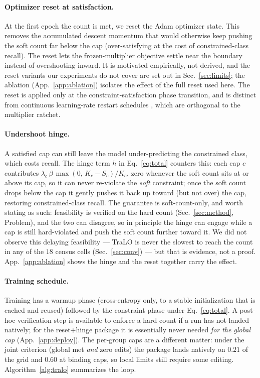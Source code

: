 \documentclass[10pt]{article}
\begin{document}
\paragraph{Optimizer reset at satisfaction.}
At the first epoch the count is met, we reset the Adam optimizer state. This
removes the accumulated descent momentum that would otherwise keep pushing
the soft count far below the cap (over-satisfying at the cost of
constrained-class recall). The reset lets the frozen-multiplier objective
settle near the boundary instead of overshooting inward. It is motivated
empirically, not derived{, and the reset variants our experiments do not cover
are set out in Sec.~\ref{sec:limits};} the ablation (App.~\ref{app:ablation}) isolates the effect of
the full reset used here. The reset is applied only at the
constraint-satisfaction phase transition, and is distinct from continuous
learning-rate restart schedules \citep{loshchilov2017sgdr}, which are
orthogonal to the multiplier ratchet.

\paragraph{Undershoot hinge.}
A satisfied cap can still leave the model under-predicting the constrained
class, which costs recall. The hinge term $h$ in Eq.~\eqref{eq:total}
counters this: each cap $c$ contributes
$\lambda_c\,\beta\,\max(0,\,K_c-S_c)/K_c$, zero whenever the soft count sits
at or above its cap, so it can never re-violate
{the \emph{soft} constraint}; once the soft count drops
below the cap it gently pushes it back up toward (but not over) the cap,
restoring constrained-class recall.
{The guarantee is soft-count-only, and worth stating as such:
feasibility is verified on the hard count (Sec.~\ref{sec:method}, Problem), and
the two can disagree, so in principle the hinge can engage while a cap is still
hard-violated and push the soft count further toward it. We did not observe this
delaying feasibility --- TraLO is never the slowest to reach the count in any of
the $18$ census cells (Sec.~\ref{sec:conv}) --- but that is evidence, not a
proof.} App.~\ref{app:ablation} shows the hinge
and the reset together carry the effect.

\paragraph{Training schedule.}
Training has a warmup phase (cross-entropy only, to a stable initialization
that is cached and reused) followed by the constraint phase under
Eq.~\eqref{eq:total}. A post-hoc verification step is available to enforce a
hard count if a run has not landed natively; for the reset+hinge package it
is essentially never needed {\emph{for the
global cap} (App.~\ref{app:deploy}). The per-group caps are a different matter: under
the joint criterion (global met \emph{and} zero edits) the package lands natively on
$0.21$ of the grid and $0.60$ at binding caps, so local limits still require some
editing}. Algorithm~\ref{alg:tralo}
summarizes the loop.
\end{document}
